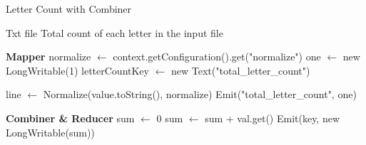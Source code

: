 \begin{algorithm}[H]
    \caption{Letter Count with Combiner}
    \begin{algorithmic}[1]
        \Require Txt file
        \Ensure Total count of each letter in the input file
        
        \vspace{1em}

        \Statex
        \noindent \textbf{Mapper}
        \State normalize $\leftarrow$ context.getConfiguration().get("normalize")
        \State one $\leftarrow$ new LongWritable(1)
        \State letterCountKey $\leftarrow$ new Text("total\_letter\_count") 
        \EndProcedure

        \vspace{1em}

        \State line $\leftarrow$ Normalize(value.toString(), normalize) 
        \State Emit("total\_letter\_count", one)
        \EndFor
        \EndProcedure

        \vspace{1em}

        \Statex
        \noindent \textbf{Combiner \& Reducer}
        \State sum $\leftarrow$ 0
        \State sum $\leftarrow$ sum + val.get()
        \EndFor
        \State Emit(key, new LongWritable(sum))
        \EndProcedure
    \end{algorithmic}
\end{algorithm}



